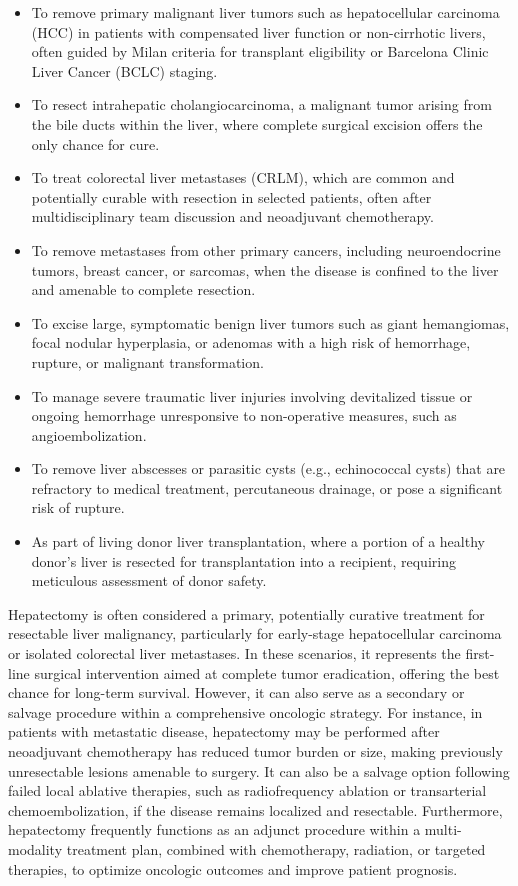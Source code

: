 \begin{itemize}
  \item To remove primary malignant liver tumors such as hepatocellular carcinoma (HCC) in patients with compensated liver function or non-cirrhotic livers, often guided by Milan criteria for transplant eligibility or Barcelona Clinic Liver Cancer (BCLC) staging.
  \item To resect intrahepatic cholangiocarcinoma, a malignant tumor arising from the bile ducts within the liver, where complete surgical excision offers the only chance for cure.
  \item To treat colorectal liver metastases (CRLM), which are common and potentially curable with resection in selected patients, often after multidisciplinary team discussion and neoadjuvant chemotherapy.
  \item To remove metastases from other primary cancers, including neuroendocrine tumors, breast cancer, or sarcomas, when the disease is confined to the liver and amenable to complete resection.
  \item To excise large, symptomatic benign liver tumors such as giant hemangiomas, focal nodular hyperplasia, or adenomas with a high risk of hemorrhage, rupture, or malignant transformation.
  \item To manage severe traumatic liver injuries involving devitalized tissue or ongoing hemorrhage unresponsive to non-operative measures, such as angioembolization.
  \item To remove liver abscesses or parasitic cysts (e.g., echinococcal cysts) that are refractory to medical treatment, percutaneous drainage, or pose a significant risk of rupture.
  \item As part of living donor liver transplantation, where a portion of a healthy donor's liver is resected for transplantation into a recipient, requiring meticulous assessment of donor safety.
\end{itemize}

Hepatectomy is often considered a primary, potentially curative treatment for resectable liver malignancy, particularly for early-stage hepatocellular carcinoma or isolated colorectal liver metastases. In these scenarios, it represents the first-line surgical intervention aimed at complete tumor eradication, offering the best chance for long-term survival. However, it can also serve as a secondary or salvage procedure within a comprehensive oncologic strategy. For instance, in patients with metastatic disease, hepatectomy may be performed after neoadjuvant chemotherapy has reduced tumor burden or size, making previously unresectable lesions amenable to surgery. It can also be a salvage option following failed local ablative therapies, such as radiofrequency ablation or transarterial chemoembolization, if the disease remains localized and resectable. Furthermore, hepatectomy frequently functions as an adjunct procedure within a multi-modality treatment plan, combined with chemotherapy, radiation, or targeted therapies, to optimize oncologic outcomes and improve patient prognosis.

